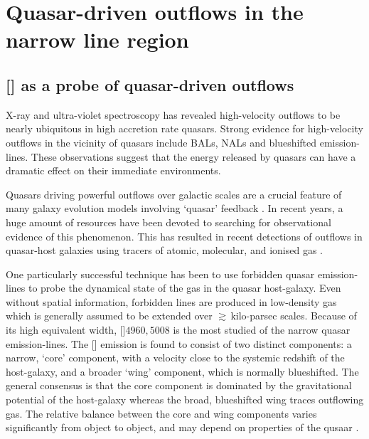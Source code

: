 
\chapter{Quasar-driven outflows in the narrow line region}
\label{ch:nlr} 

\section{[] as a probe of quasar-driven outflows}

X-ray and ultra-violet spectroscopy has revealed high-velocity outflows to be nearly ubiquitous in high accretion rate quasars.
Strong evidence for high-velocity outflows in the vicinity of quasars include BALs, NALs and blueshifted emission-lines. 
These observations suggest that the energy released by quasars can have a dramatic effect on their immediate environments. 

Quasars driving powerful outflows over galactic scales are a crucial feature of many galaxy evolution models involving `quasar' feedback \citep[e.g.][]{silk98,king03,dimatteo05,king15}.
In recent years, a huge amount of resources have been devoted to searching for observational evidence of this phenomenon.  
This has resulted in recent detections of outflows in quasar-host galaxies using tracers of atomic, molecular, and ionised gas \citep[e.g.][]{nesvadba06,arav08,nesvadba08,moe09,dunn10,alexander10,harrison12,harrison14,nesvadba10,rupke13,veilleux13,nardini15,feruglio10,alatalo11,cimatti13,cicone14}.  

One particularly successful technique has been to use forbidden quasar emission-lines to probe the dynamical state of the gas in the quasar host-galaxy. 
Even without spatial information, forbidden lines are produced in low-density gas which is generally assumed to be extended over $\gtrsim$\,kilo-parsec scales. 
Because of its high equivalent width, []\ll$4960,5008$ is the most studied of the narrow quasar emission-lines. 
The [] emission is found to consist of two distinct components: a narrow, `core' component, with a velocity close to the systemic redshift of the host-galaxy, and a broader `wing' component, which is normally blueshifted. 
The general consensus is that the core component is dominated by the gravitational potential of the host-galaxy whereas the broad, blueshifted wing traces outflowing gas. 
The relative balance between the core and wing components varies significantly from object to object, and may depend on properties of the qusaar \citep[e.g. luminosity;][]{shen14}. 

